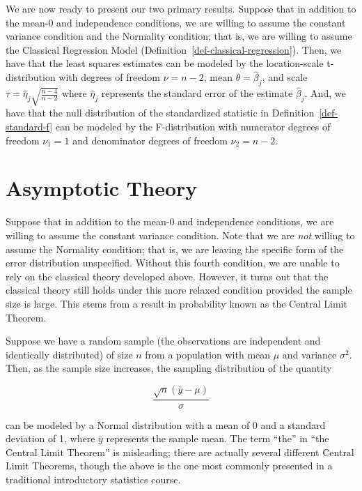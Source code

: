 \documentclass[
  letterpaper,
  DIV=11,
  numbers=noendperiod]{scrreprt}
\theoremstyle{definition}
\theoremstyle{definition}
\theoremstyle{plain}
\theoremstyle{remark}
\begin{document}
We are now ready to present our two primary results. Suppose that in
addition to the mean-0 and independence conditions, we are willing to
assume the constant variance condition and the Normality condition; that
is, we are willing to assume the Classical Regression Model
(Definition~\ref{def-classical-regression}). Then, we have that the
least squares estimates can be modeled by the location-scale
t-distribution with degrees of freedom \(\nu = n - 2\), mean
\(\theta = \widehat{\beta}_j\), and scale
\(\tau = \widehat{\eta}_j\sqrt{\frac{n - 4}{n - 2}}\) where
\(\widehat{\eta}_j\) represents the standard error of the estimate
\(\widehat{\beta}_j\). And, we have that the null distribution of the
standardized statistic in Definition~\ref{def-standard-f} can be modeled
by the F-distribution with numerator degrees of freedom \(\nu_1 = 1\)
and denominator degrees of freedom \(\nu_2 = n - 2\).

\section{Asymptotic Theory}\label{asymptotic-theory}

Suppose that in addition to the mean-0 and independence conditions, we
are willing to assume the constant variance condition. Note that we are
\emph{not} willing to assume the Normality condition; that is, we are
leaving the specific form of the error distribution unspecified. Without
this fourth condition, we are unable to rely on the classical theory
developed above. However, it turns out that the classical theory still
holds under this more relaxed condition provided the sample size is
large. This stems from a result in probability known as the Central
Limit Theorem.

Suppose we have a random sample (the observations are independent and
identically distributed) of size \(n\) from a population with mean
\(\mu\) and variance \(\sigma^2\). Then, as the sample size increases,
the sampling distribution of the quantity

\[\frac{\sqrt{n} \left(\bar{y} - \mu\right)}{\sigma}\]

can be modeled by a Normal distribution with a mean of 0 and a standard
deviation of 1, where \(\bar{y}\) represents the sample mean. The term
``the'' in ``the Central Limit Theorem'' is misleading; there are
actually several different Central Limit Theorems, though the above is
the one most commonly presented in a traditional introductory statistics
course.
\end{document}
